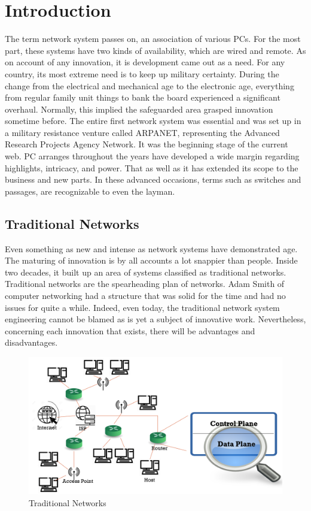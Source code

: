 \chapter{Introduction}

The term network system passes on, an association of various PCs. For the most part, these systems have two kinds of availability, which are wired and remote. As on account of any innovation, it is development came out as a need. For any country, its most extreme need is to keep up military certainty. During the change from the electrical and mechanical age to the electronic age, everything from regular family unit things to bank the board experienced a significant overhaul. Normally, this implied the safeguarded area grasped innovation sometime before. The entire first network system was essential and was set up in a military resistance venture called ARPANET, representing the Advanced Research Projects Agency Network. It was the beginning stage of the current web. PC arranges throughout the years have developed a wide margin regarding highlights, intricacy, and power. That as well as it has extended its scope to the business and new parts. In these advanced occasions, terms such as switches and passages, are recognizable to even the layman.
\vspace{5mm}
\section{Traditional Networks}

Even something as new and intense as network systems have demonstrated age. The maturing of innovation is by all accounts a lot snappier than people. Inside two decades, it built up an area of systems classified as traditional networks. Traditional networks are the spearheading plan of networks. Adam Smith of computer networking had a structure that was solid for the time and had no issues for quite a while. Indeed, even today, the traditional network system engineering cannot be blamed as is yet a subject of innovative work. Nevertheless, concerning each innovation that exists, there will be advantages and disadvantages.

\begin{figure}[!hbt]
    \centering
    \includegraphics[width=\textwidth,keepaspectratio]{images/TRADITIONAL-NETWORK.png}
    \caption{Traditional Networks \cite{sdnimages}}
    \label{fig:Tradnets}
\end{figure}

